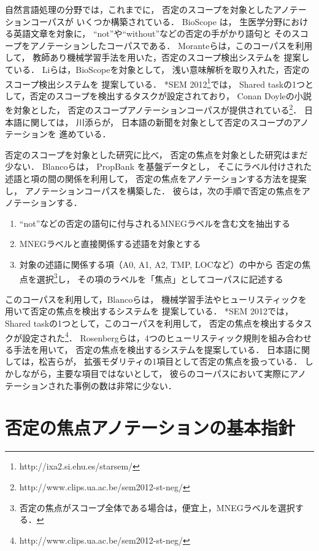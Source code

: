 \documentclass[japanese]{jnlp_1.4}
\begin{document}
自然言語処理の分野では，これまでに，
否定のスコープを対象としたアノテーションコーパスが
いくつか構築されている．
BioScope \cite{VeronikaVince2008}は，
生医学分野における英語文章を対象に，
``not''や``without''などの否定の手がかり語句と
そのスコープをアノテーションしたコーパスである．
Moranteらは，このコーパスを利用して，
教師あり機械学習手法を用いた，否定のスコープ検出システムを
提案している\cite{Morante2008}．
Liらは，BioScopeを対象として，
浅い意味解析を取り入れた，否定のスコープ検出システムを
提案している\cite{Li2010}．
*SEM 2012\footnote{
http://ixa2.si.ehu.es/starsem/}では，
Shared taskの1つとして，否定のスコープを検出するタスクが設定されており，
Conan Doyleの小説を対象とした，
否定のスコープアノテーションコーパスが提供されている\footnote{
http://www.clips.ua.ac.be/sem2012-st-neg/}．
日本語に関しては，
川添らが，
日本語の新聞を対象として否定のスコープのアノテーションを
進めている\cite{Kawazoe2011}．

否定のスコープを対象とした研究に比べ，
否定の焦点を対象とした研究はまだ少ない．
Blancoらは，
PropBank \cite{Olga2005}を基盤データとし，
そこにラベル付けされた述語と項の間の関係を利用して，
否定の焦点をアノテーションする方法を提案し，
アノテーションコーパスを構築した\cite{EduardoMoldo2011b}．
彼らは，次の手順で否定の焦点をアノテーションする．
\begin{enumerate}
\item ``not''などの否定の語句に付与されるMNEGラベルを含む文を抽出する
\item MNEGラベルと直接関係する述語を対象とする
\item 対象の述語に関係する項（A0, A1, A2, TMP, LOCなど）の中から
  否定の焦点を選択\footnote{
否定の焦点がスコープ全体である場合は，便宜上，MNEGラベルを選択する．}し，
  その項のラベルを「焦点」としてコーパスに記述する
\end{enumerate}
このコーパスを利用して，Blancoらは，
機械学習手法やヒューリスティックを用いて否定の焦点を検出するシステムを
提案している\cite{EduardoMoldo2011b,EduardoMoldo2011}．
*SEM 2012では，
Shared taskの1つとして，このコーパスを利用して，
否定の焦点を検出するタスクが設定された\footnote{
http://www.clips.ua.ac.be/sem2012-st-neg/}．
Rosenbergらは，4つのヒューリスティック規則を組み合わせる手法を用いて，
否定の焦点を検出するシステムを提案している\cite{Rosenberg2012}．
日本語に関しては，松吉らが，
拡張モダリティの1項目として否定の焦点を扱っている\cite{matuyosi2010}．
しかしながら，主要な項目ではないとして，
彼らのコーパスにおいて実際にアノテーションされた事例の数は非常に少ない．


\section{否定の焦点アノテーションの基本指針}
\end{document}
